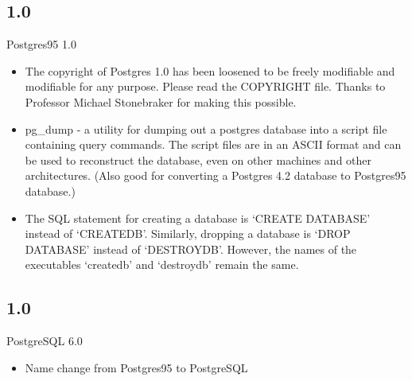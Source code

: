 \documentclass[t,10pt]{beamer}
\begin{document}
\subsection{1.0}
\begin{frame}{Postgres95 1.0}
  \begin{itemize}%
  \item The copyright of Postgres 1.0 has been loosened to be freely
    modifiable and modifiable for any purpose.  Please read the
    COPYRIGHT file.  Thanks to Professor Michael Stonebraker for making
    this possible.
  \item pg\_dump - a utility for dumping out a postgres database into
    a script file containing query commands. The script files are in
    an ASCII format and can be used to reconstruct the database, even
    on other machines and other architectures. (Also good for
    converting a Postgres 4.2 database to Postgres95 database.)
  \item The SQL statement for creating a database is `CREATE DATABASE' instead
    of `CREATEDB'. Similarly, dropping a database is `DROP DATABASE' instead
    of `DESTROYDB'. However, the names of the executables `createdb' and
    `destroydb' remain the same.
  \end{itemize}
\end{frame}
\subsection{1.0}
\begin{frame}{PostgreSQL 6.0}
  \begin{itemize}%
  \item Name change from Postgres95 to PostgreSQL
  \end{itemize}
\end{frame}
\end{document}
